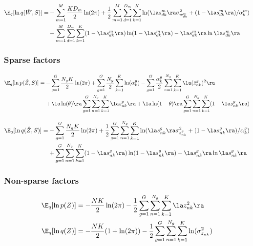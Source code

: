 \begin{equation} \begin{aligned}
	\E_q[\ln q(\hat{W}, S)] =&-\sum_{m=1}^{M}\frac{KD_m}{2}\ln(2\pi) + \frac{1}{2}\sum_{m=1}^{M}\sum_{d=1}^{D_m}\sum_{k=1}^{K}\ln(\la s_{dk}^m \ra \sigma_{w_{dk}^m}^2 + (1-\la s_{dk}^m \ra)/\alpha_k^m) \\
	&+ \sum_{m=1}^{M} \sum_{d=1}^{D_m} \sum_{k=1}^{K} (1-\la s_{dk}^m \ra) \ln(1 - \la s_{dk}^m \ra) - \la s_{dk}^m \ra \ln \la s_{dk}^m \ra
\end{aligned} \end{equation}

\subsubsection*{Sparse factors}

\begin{equation} \begin{aligned}
    \E_q[\ln p(\hat{Z},S)] =& -\sum_{g=1}^{G}\frac{N_g K}{2}\ln(2\pi) + \sum_{g=1}^{G}\frac{N_g}{2}\sum_{k=1}^{K} \ln(\alpha_k^g) - \sum_{g=1}^{G} \frac{\alpha_k^g}{2} \sum_{n=1}^{N_g} \sum_{k=1}^{K} \la (\hat{z}_{nk}^g)^2 \ra \\
    & + \la \ln(\theta) \ra \sum_{g=1}^{G} \sum_{n=1}^{N_g} \sum_{k=1}^{K} \la s_{nk}^g \ra + \la \ln(1-\theta) \ra \sum_{g=1}^{G} \sum_{n=1}^{N_g}\sum_{k=1}^{K} (1- \la s_{nk}^g \ra)
\end{aligned} \end{equation}

\begin{equation} \begin{aligned}
	\E_q[\ln q(\hat{Z}, S)] =&-\sum_{g=1}^{G}\frac{N_g K}{2}\ln(2\pi) + \frac{1}{2}\sum_{g=1}^{G}\sum_{n=1}^{N_g}\sum_{k=1}^{K}\ln(\la s_{nk}^g \ra \sigma_{z_{nk}^g}^2 + (1-\la s_{nk}^g \ra)/\alpha_k^g) \\
	&+ \sum_{g=1}^{G} \sum_{n=1}^{N_g} \sum_{k=1}^{K} (1-\la s_{nk}^g \ra) \ln(1 - \la s_{nk}^g \ra) - \la s_{nk}^g \ra \ln \la s_{nk}^g \ra
\end{aligned} \end{equation}

\subsubsection*{Non-sparse factors}
\begin{equation} \begin{aligned}
	\E_q [\ln p(Z)] &= -\frac{NK}{2}\ln(2\pi) -\frac{1}{2} \sum_{g=1}^G\sum_{n=1}^{N_g}\sum_{k=1}^{K} \la z_{nk}^2 \ra \\
	\E_q [\ln q(Z)] &= - \frac{NK}{2}(1 + \ln(2\pi)) - \frac{1}{2}\sum_{g=1}^G\sum_{n=1}^{N_g}\sum_{k=1}^{K} \ln(\sigma_{z_{nk}}^2)
\end{aligned} \end{equation}

